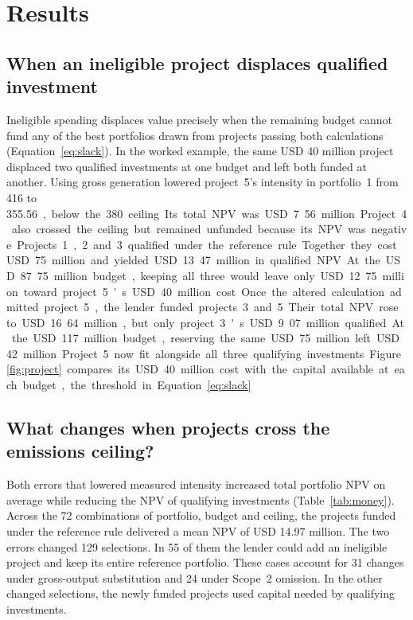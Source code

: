 \section{Results}
\subsection{When an ineligible project displaces qualified investment}
Ineligible spending displaces value precisely when the remaining budget cannot fund any of the best portfolios drawn from projects passing both calculations (Equation~\eqref{eq:slack}). In the worked example, the same USD 40 million project displaced two qualified investments at one budget and left both funded at another. Using gross generation lowered project~5's intensity in portfolio~1 from 416 to 355.56~\unit, below the 380 ceiling. Its total NPV was USD 7.56 million. Project~4 also crossed the ceiling but remained unfunded because its NPV was negative.

Projects~1, 2 and~3 qualified under the reference rule. Together they cost USD 75 million and yielded USD 13.47 million in qualified NPV. At the USD 87.75 million budget, keeping all three would leave only USD 12.75 million toward project~5's USD 40 million cost. Once the altered calculation admitted project~5, the lender funded projects~3 and~5. Their total NPV rose to USD 16.64 million, but only project~3's USD 9.07 million qualified. At the USD 117 million budget, reserving the same USD 75 million left USD 42 million. Project~5 now fit alongside all three qualifying investments. Figure~\ref{fig:project} compares its USD 40 million cost with the capital available at each budget, the threshold in Equation~\eqref{eq:slack}.
\ifdefined\readingcopy\fi



\subsection{What changes when projects cross the emissions ceiling?}
Both errors that lowered measured intensity increased total portfolio NPV on average while reducing the NPV of qualifying investments (Table~\ref{tab:money}). Across the 72 combinations of portfolio, budget and ceiling, the projects funded under the reference rule delivered a mean NPV of USD 14.97 million. The two errors changed 129 selections. In 55 of them the lender could add an ineligible project and keep its entire reference portfolio. These cases account for 31 changes under gross-output substitution and 24 under Scope~2 omission. In the other changed selections, the newly funded projects used capital needed by qualifying investments.
\ifdefined\readingcopy\fi



